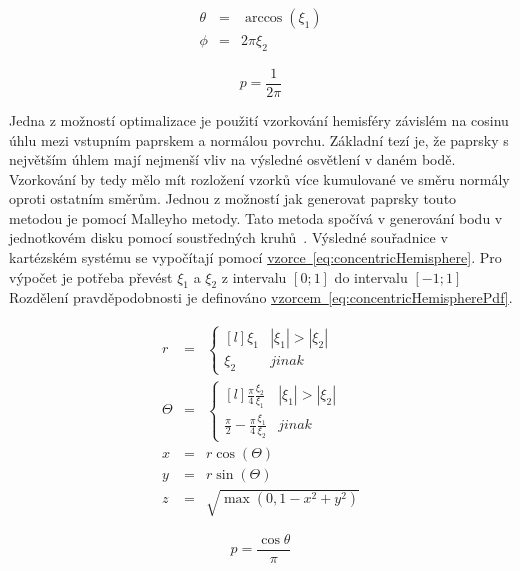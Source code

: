 \documentclass[czech,master]{diploma}
\newcommand{\interval}[1]{\left[{#1}\right]}
\newcommand{\randU}{\xi_{1}}
\newcommand{\randV}{\xi_{2}}
\begin{document}
\begin{eqnarray}
  \theta & = & \arccos(\randU) \nonumber \\
  \phi & = & 2\pi\randV \label{eq:hemisphereSampling}
\end{eqnarray}

\begin{equation} \label{eq:hemisphereSamplingPdf}
  p = \frac{1}{2\pi}
\end{equation}

Jedna z možností optimalizace je použití vzorkování hemisféry závislém na cosinu úhlu mezi vstupním paprskem a normálou povrchu. Základní tezí je, že paprsky s největším úhlem mají nejmenší vliv na výsledné osvětlení v daném bodě. Vzorkování by tedy mělo mít rozložení vzorků více kumulované ve směru normály oproti ostatním směrům. Jednou z možností jak generovat paprsky touto metodou je pomocí Malleyho metody. Tato metoda spočívá v generování bodu v jednotkovém disku pomocí soustředných kruhů~\cite{PHARR2017747}. Výsledné souřadnice v kartézském systému se vypočítají pomocí \hyperref[eq:concentricHemisphere]{vzorce~\ref{eq:concentricHemisphere}}. Pro výpočet je potřeba převést \(\randU\) a \(\randV\) z intervalu \(\interval{0;1}\) do intervalu \(\interval{-1;1}\)  Rozdělení pravděpodobnosti je definováno \hyperref[eq:concentricHemisphere]{vzorcem~\ref{eq:concentricHemispherePdf}}.

\begin{eqnarray}
  r & = & \left\{\begin{matrix*}[l] \randU & |\randU| > \left | \randV \right |\\ \randV & jinak \end{matrix*}\right. \nonumber \\
  \Theta & = & \left\{\begin{matrix*}[l] \frac{\pi}{4}\frac{\randV}{\randU} & |\randU| > \left | \randV \right |\\ \frac{\pi}{2}-\frac{\pi}{4}\frac{\randU}{\randV} & jinak \end{matrix*}\right. \nonumber \\
  x & = &r\cos(\Theta)\nonumber \\
  y & = &r\sin(\Theta)\nonumber \\
  z & = &\sqrt{ \max(0, 1 - x^2 + y^2) }\label{eq:concentricHemisphere}
\end{eqnarray}

\begin{equation} \label{eq:concentricHemispherePdf}
  p = \frac{\cos\theta}{\pi}
\end{equation}
\end{document}
